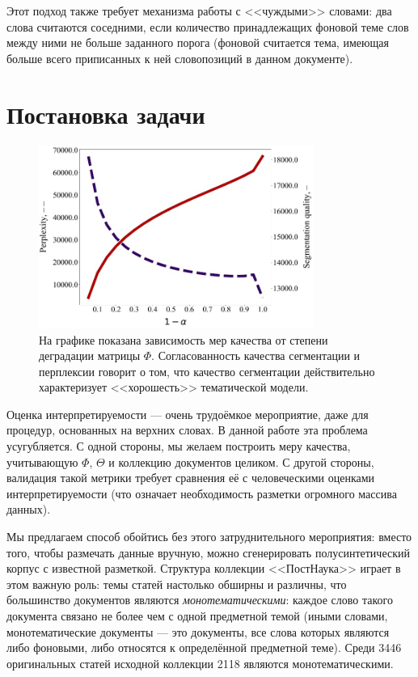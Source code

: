 Этот подход также требует механизма работы с <<чуждыми>> словами: два слова считаются соседними, если количество принадлежащих фоновой теме слов между ними не больше заданного порога (фоновой считается тема, имеющая больше всего приписанных к ней словопозиций в данном документе).

\section{Постановка задачи}

\begin{figure}[h]
    \centering
    \includegraphics[width=0.8\textwidth]{images/segm_1.png}
    \caption{На графике показана зависимость мер качества от степени деградации матрицы $\Phi$. Согласованность качества сегментации и перплексии говорит о том, что качество сегментации действительно характеризует <<хорошесть>> тематической модели.}
    \label{plot:segm_quality-iteration}
\end{figure}

Оценка интерпретируемости --- очень трудоёмкое мероприятие, даже для процедур, основанных на верхних словах.
В данной работе эта проблема усугубляется. С одной стороны, мы желаем построить меру качества, учитывающую $\Phi$, $\Theta$ и коллекцию документов целиком. С другой стороны, валидация такой метрики требует сравнения её с человеческими оценками интерпретируемости (что означает необходимость разметки огромного массива данных).

Мы предлагаем способ обойтись без этого затруднительного мероприятия: вместо того, чтобы размечать данные вручную, можно сгенерировать полусинтетический корпус с известной разметкой. Структура коллекции <<ПостНаука>> играет в этом важную роль: темы статей настолько обширны и различны, что большинство документов являются \textit{монотематическими}: каждое слово такого документа связано не более чем с одной предметной темой (иными словами, монотематические документы --- это документы, все слова которых являются либо фоновыми, либо относятся к определённой предметной теме). Среди 3446 оригинальных статей исходной коллекции 2118 являются монотематическими.

